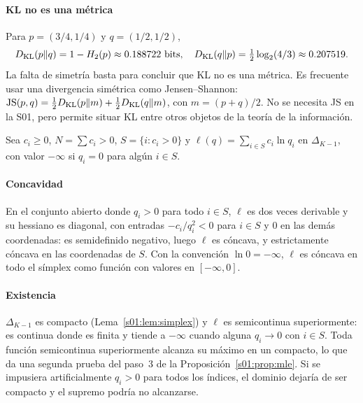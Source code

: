 \paragraph{KL no es una métrica}
Para $p=(3/4,1/4)$ y $q=(1/2,1/2)$,
\[
D_{\rm KL}(p\|q)=1-H_2(p)\approx0.188722\text{ bits},
\quad D_{\rm KL}(q\|p)=\tfrac12\log_2(4/3)\approx0.207519.
\]
La falta de simetría basta para concluir que KL no es una métrica.
Es frecuente usar una divergencia simétrica como Jensen--Shannon:
$\mathrm{JS}(p,q)=\tfrac12D_{\rm KL}(p\|m)+\tfrac12D_{\rm KL}(q\|m)$,
con $m=(p+q)/2$. No se necesita JS en la S01, pero permite situar KL
entre otros objetos de la teoría de la información.

Sea $c_i\ge0$, $N=\sum c_i>0$, $S=\{i:c_i>0\}$ y
$\ell(q)=\sum_{i\in S}c_i\ln q_i$ en $\Delta_{K-1}$, con valor $-\infty$ si
$q_i=0$ para algún $i\in S$.

\paragraph{Concavidad}
En el conjunto abierto donde $q_i>0$ para todo $i\in S$, $\ell$ es dos veces
derivable y su hessiano es diagonal, con entradas $-c_i/q_i^2<0$ para $i\in S$ y
$0$ en las demás coordenadas: es semidefinido negativo, luego $\ell$ es cóncava, y
estrictamente cóncava en las coordenadas de $S$. Con la convención
$\ln0=-\infty$, $\ell$ es cóncava en todo el símplex como función con valores en
$[-\infty,0]$.

\paragraph{Existencia}
$\Delta_{K-1}$ es compacto (Lema~\ref{s01:lem:simplex}) y $\ell$ es semicontinua
superiormente: es continua donde es finita y tiende a $-\infty$ cuando alguna
$q_i\to0$ con $i\in S$. Toda función semicontinua superiormente alcanza su máximo en
un compacto, lo que da una segunda prueba del paso~3 de la
Proposición~\ref{s01:prop:mle}. Si se impusiera artificialmente $q_i>0$ para todos
los índices, el dominio dejaría de ser compacto y el supremo podría no alcanzarse.

